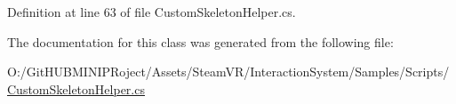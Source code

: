 Definition at line 63 of file Custom\+Skeleton\+Helper.\+cs.



The documentation for this class was generated from the following file\+:\begin{DoxyCompactItemize}
\item 
O\+:/\+Git\+H\+U\+B\+M\+I\+N\+I\+P\+Roject/\+Assets/\+Steam\+V\+R/\+Interaction\+System/\+Samples/\+Scripts/\mbox{\hyperlink{_custom_skeleton_helper_8cs}{Custom\+Skeleton\+Helper.\+cs}}\end{DoxyCompactItemize}
